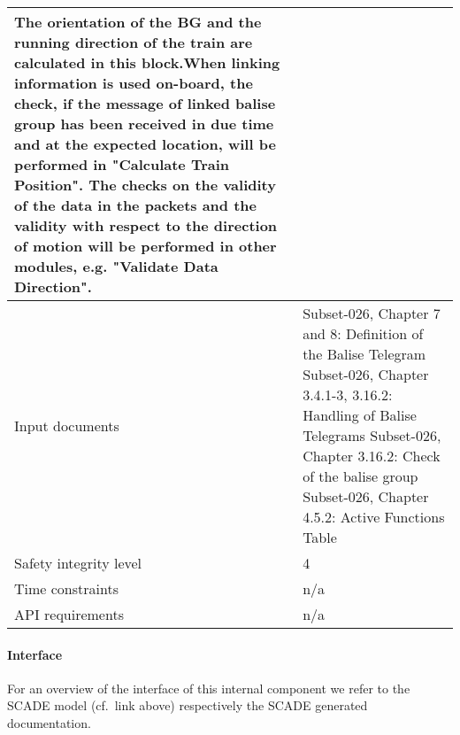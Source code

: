 \begin{longtable}{p{}p{}}
The orientation of the BG and the running direction of the train are
calculated in this block.When linking information is used on-board,
the check, if the message of linked balise group has been received
in due time and at the expected location, will be performed in
"Calculate Train Position". The checks on the validity of the data in
the packets and the validity with respect to the direction of motion
will be performed in other modules, e.g. "Validate Data Direction".\\
\midrule
Input documents	& 
Subset-026, Chapter 7 and 8: Definition of the Balise Telegram\newline
Subset-026, Chapter 3.4.1-3, 3.16.2: Handling of Balise Telegrams\newline
Subset-026, Chapter 3.16.2: Check of the balise group\newline
Subset-026, Chapter 4.5.2: Active Functions Table\\
\midrule
Safety integrity level		& 4 \\
\midrule
Time constraints		& n/a \\
\midrule
API requirements 		& n/a \\
\bottomrule
\end{longtable}


\paragraph{Interface}

For an overview of the interface of this internal component we refer to the SCADE model (cf.~link above) respectively the SCADE generated documentation.
